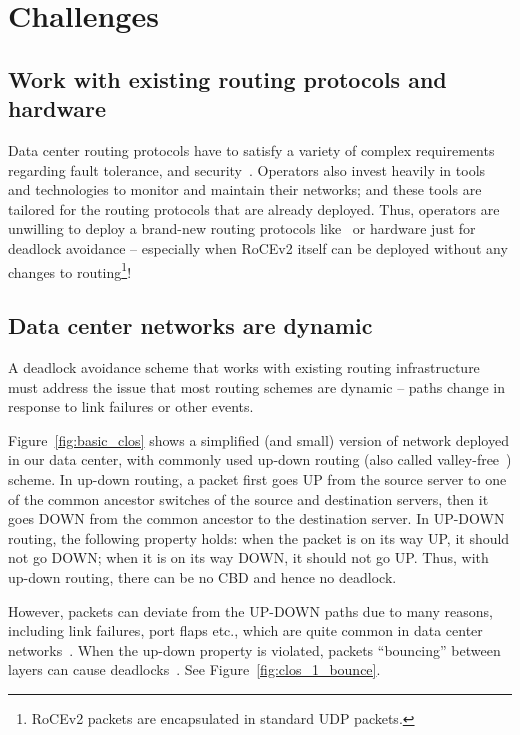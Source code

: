 \section{Challenges}
\label{sec:challenges}

\subsection{Work with existing routing protocols and hardware}
\label{sec:incremental} Data center routing protocols have to satisfy a variety
of complex requirements regarding fault tolerance, and
security~\cite{beckett2016don}.  Operators also invest heavily in  tools and
technologies to monitor and maintain their networks; and these tools are
tailored for the routing protocols that are already deployed.  Thus, operators
are unwilling to deploy a brand-new routing
protocols like~\cite{dally,duato93,dally93,sancho2004,flich2012survey,lash,wu2003fault,glass,duato2001,domke2011,puente1999,dfedst16}
or hardware just for deadlock avoidance --  especially when RoCEv2 itself can be
deployed without any changes to routing\footnote{RoCEv2 packets are encapsulated
in standard UDP packets.}! 

\subsection{Data center networks are dynamic}\label{sec:reroute}

A deadlock avoidance scheme that works with existing routing infrastructure must
address the issue that most routing schemes are dynamic -- paths change in
response to link failures or other events.

Figure~\ref{fig:basic_clos} shows a simplified (and small) version
of network deployed in our data center, with commonly used up-down routing (also
called valley-free~\cite{qiu2007toward}) scheme.  In up-down routing, a packet first
goes UP from the source server to one of the common ancestor switches of the
source and destination servers, then it goes DOWN from the common ancestor to
the destination server.  In UP-DOWN routing, the following property holds: when
the packet is on its way UP, it should not go DOWN; when it is on its way DOWN,
it should not go UP. Thus, with up-down routing, there can be no CBD and hence
no deadlock.

However, packets can deviate from the UP-DOWN paths due to many reasons,
including link failures, port flaps etc., which are quite common in data
center networks~\cite{netpilot,f10}. When the up-down property is violated,
packets ``bouncing'' between layers can cause
deadlocks~\cite{shpiner2016unlocking}. See
Figure~\ref{fig:clos_1_bounce}.

